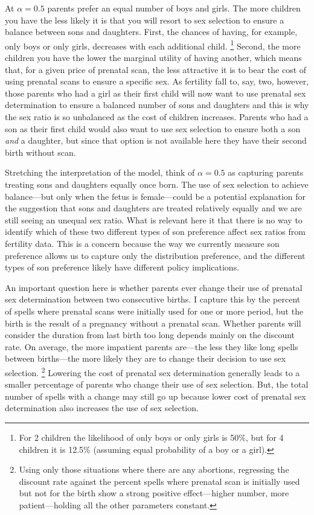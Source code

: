 \documentclass[12pt,letterpaper]{article}
\begin{document}
At $\alpha = 0.5$ parents prefer an equal number of boys and girls.
The more children you have the less likely it is that you will
resort to sex selection to ensure a balance between sons and daughters.
First, the chances of having, for example, only boys or only
girls, decreases with each additional child.%
\footnote{
For 2 children the likelihood of only boys or only girls
is 50\%, but for 4 children it is 12.5\% (assuming equal probability
of a boy or a girl).
}
Second, the more children you have the lower the marginal
utility of having another, which means that, for a given price
of prenatal scan, the less attractive it is to bear the cost of using
prenatal scans to ensure a specific sex.
As fertility fall to, say, two, however, those parents who had a girl as their 
first child will now want to use prenatal sex determination to 
ensure a balanced number of sons and daughters and this is why
the sex ratio is so unbalanced as the cost of children increases.
Parents who had a son as their first child would also want to
use sex selection to ensure both a son \emph{and} a daughter, but since
that option is not available here they have their
second birth without scan.

Stretching the interpretation of the model, think of $\alpha=0.5$ 
as capturing parents treating sons and daughters equally once born.
The use of sex selection to achieve balance---but only when the
fetus is female---could be a potential explanation for the
suggestion that sons and daughters are treated relatively equally and 
we are still seeing an unequal sex ratio.
What is relevant here it that there is no way to identify which 
of these two different types of son preference affect sex ratios 
from fertility data.
This is a concern because the way we currently measure son preference
allows us to capture only the distribution preference, and 
the different types of son preference likely have different policy 
implications.


An important question here is whether parents ever
change their use of prenatal sex determination between
two consecutive births.
I capture this by the percent of spells where prenatal
scans were initially used for one or more period, but the birth
is the result of a pregnancy without a prenatal scan.
Whether parents will consider the duration from last birth too long 
depends mainly on the discount rate.
On average, the more impatient parents are---the less they
like long spells between births---the more likely they are to
change their decision to use sex selection.%
\footnote{
Using only those situations where there are any abortions,
regressing the discount rate against the percent spells where
prenatal scan is initially used but not for the birth show
a strong positive effect---higher number, more patient---holding
all the other parameters constant.
}
Lowering the cost of prenatal sex determination generally leads to 
a smaller percentage of parents who change their use of sex selection.
But, the total number of spells with a change may still
go up because lower cost of prenatal sex determination also
increases the use of sex selection.
\end{document}
